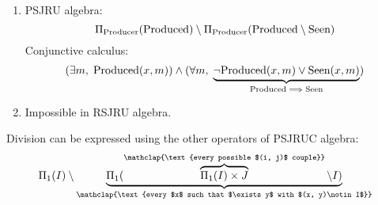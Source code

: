 \documentclass{../../cs-classes/cs-classes}
\newcommand*{\seen}{\textnormal{Seen}}
\newcommand*{\produced}{\textnormal{Produced}}
\newcommand*{\producer}{\textnormal{Producer}}
\begin{document}
\begin{exercise}
\begin{enumerate}
    \item PSJRU algebra:
    \begin{equation*}
        \Pi_{\producer}(\produced)\setminus \Pi_{\producer}(\produced\setminus\seen)
    \end{equation*}
    Conjunctive calculus:
    \begin{equation*}
        (\exists m, \; \produced(x, m))\land(\forall m, \; \underbrace{\lnot\produced(x, m)\lor\seen(x, m)}_{\produced\implies\seen})
    \end{equation*}
    
    \item Impossible in RSJRU algebra.

  \end{enumerate}  
\end{exercise}

\begin{exercise}
    Division can be expressed using the other operators of PSJRUC algebra:
    \begin{equation*}
        \Pi_1(I)\setminus \underbrace{\Pi_1(\overbrace{\Pi_1(I)\times J}^{\mathclap{\text{every possible $(i, j)$ couple}}} \setminus I)}_{\mathclap{\text{every $x$ such that $\exists y$ with $(x, y)\notin I$}}}
    \end{equation*}
\end{exercise}
\end{document}
